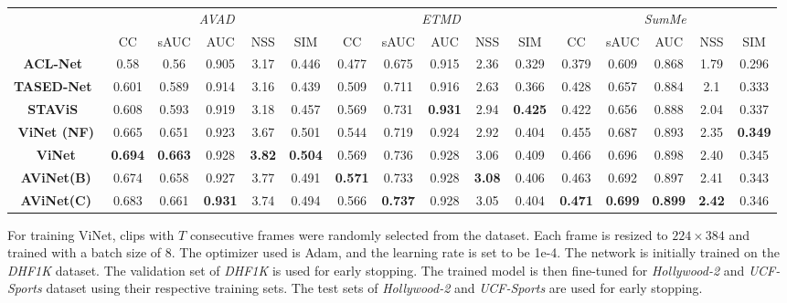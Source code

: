 \documentclass[letterpaper, 10 pt, conference]{ieeeconf}  \usepackage{times}
\begin{document}
\begin{table*}[t]
\begin{center}
\begin{tabular}{|c|ccccc|ccccc|ccccc|}
\hline
 & \multicolumn{5}{c|}{\emph{AVAD}} & \multicolumn{5}{c|}{\emph{ETMD}} & \multicolumn{5}{c|}{\emph{SumMe}} \\
 & CC & sAUC & AUC & NSS & SIM & CC & sAUC & AUC & NSS & SIM & CC & sAUC & AUC & NSS & SIM \\ 
 \hline\hline
\textbf{ACL-Net}~\cite{wang2019revisiting} & 0.58 & 0.56 & 0.905 & 3.17 & 0.446 & 0.477 & 0.675 & 0.915 & 2.36 & 0.329 & 0.379 & 0.609 & 0.868 & 1.79 & 0.296 \\
\textbf{TASED-Net}~\cite{min2019tased} & 0.601 & 0.589 & 0.914 & 3.16 & 0.439 & 0.509 & 0.711 & 0.916 & 2.63 & 0.366 & 0.428 & 0.657 & 0.884 & 2.1 & 0.333 \\
\textbf{STAViS}~\cite{tsiami2020stavis} & 0.608 & 0.593 & 0.919 & 3.18 & 0.457 & 0.569 & 0.731 & \textbf{0.931} & 2.94 & \textbf{0.425} & 0.422 & 0.656 & 0.888 & 2.04 & 0.337 \\ \hline
\textbf{ViNet (NF)} & 0.665 & 0.651 & 0.923 & 3.67 & 0.501 & 0.544 & 0.719 & 0.924 & 2.92 & 0.404 & 0.455 & 0.687 & 0.893 & 2.35 & \textbf{0.349} \\
\textbf{ViNet} & \textbf{0.694} & \textbf{0.663} & 0.928 & \textbf{3.82} & \textbf{0.504} & 0.569 & 0.736 & 0.928 & 3.06 & 0.409 & 0.466 & 0.696 & 0.898 & 2.40 & 0.345 \\
\textbf{AViNet(B)} & 0.674 & 0.658 & 0.927 & 3.77 & 0.491 &\textbf{0.571} & 0.733 & 0.928 & \textbf{3.08} & 0.406 & 0.463 & 0.692 & 0.897 & 2.41 & 0.343 \\
\textbf{AViNet(C)} & 0.683 & 0.661 & \textbf{0.931} & 3.74 & 0.494 & 0.566 & \textbf{0.737} & 0.928 & 3.05 & 0.404 & \textbf{0.471} & \textbf{0.699} & \textbf{0.899} & \textbf{2.42} & 0.346 \\ \hline
\end{tabular}



\end{center}

\label{table:audio_test_results1}
\end{table*}





For training ViNet, clips with $T$ consecutive frames were randomly selected from the dataset. Each frame is resized to $224\times384$ and trained with a batch size of $8$. The optimizer used is Adam, and the learning rate is set to be 1e-4. The network is initially trained on the \emph{DHF1K} dataset. The validation set of \emph{DHF1K} is used for early stopping. The trained model is then fine-tuned for \emph{Hollywood-2} and \emph{UCF-Sports} dataset using their respective training sets. The test sets of \emph{Hollywood-2} and \emph{UCF-Sports} are used for early stopping.
\end{document}
